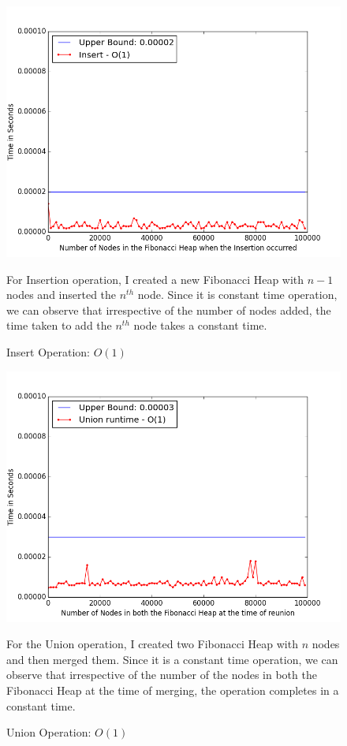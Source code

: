 \begin{figure}
\includegraphics[width=0.95\columnwidth]{Figures/fibonacciHeapPerformanceInsert}
\caption{Insert Operation: $O(1)$}
\label{performanceInsert}
For Insertion operation, I created a new Fibonacci Heap with $n-1$ nodes and inserted the $n^{th}$ node. Since it is constant time operation, we can observe that irrespective of the number of nodes added, the time taken to add the $n^{th}$ node takes a constant time.
\end{figure}
\begin{figure}
\includegraphics[width=0.95\columnwidth]{Figures/fibonacciHeapPerformanceUnion}
\caption{Union Operation: $O(1)$}
\label{performanceUnion}
For the Union operation, I created two Fibonacci Heap with $n$ nodes and then merged them. Since it is a constant time operation, we can observe that irrespective of the number of the nodes in both the Fibonacci Heap at the time of merging, the operation completes in a constant time.
\end{figure}
